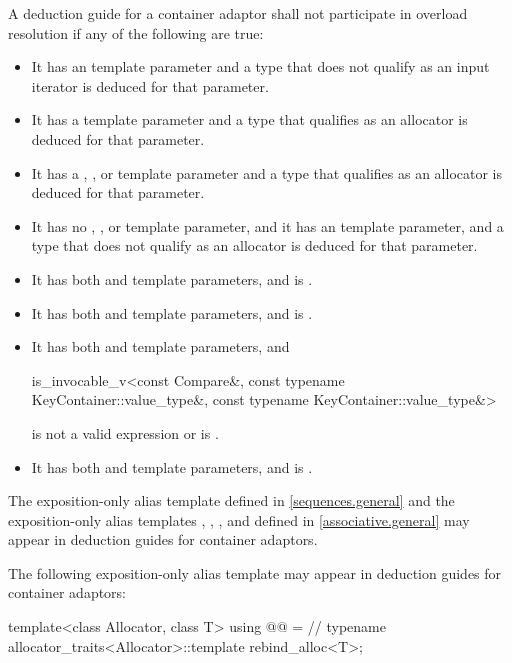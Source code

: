 \pnum
A deduction guide for a container adaptor shall not participate in overload resolution if any of the following are true:
\begin{itemize}
\item It has an  template parameter and a type that does not qualify as an input iterator is deduced for that parameter.
\item It has a  template parameter and a type that qualifies as an allocator is deduced for that parameter.
\item It has a , , or  template parameter and a type that qualifies as an allocator is deduced for that parameter.
\item It has no , , or  template parameter, and it has an  template parameter, and a type that does not qualify as an allocator is deduced for that parameter.
\item It has both  and  template parameters, and  is .
\item It has both  and  template parameters, and
 is .
\item It has both  and  template parameters, and
\begin{codeblock}
is_invocable_v<const Compare&,
              const typename KeyContainer::value_type&,
              const typename KeyContainer::value_type&>
\end{codeblock}
is not a valid expression or is .
\item It has both  and  template parameters, and
 is .
\end{itemize}

\pnum
The exposition-only alias template 
defined in \ref{sequences.general} and
the exposition-only alias templates , ,
, and 
defined in \ref{associative.general}
may appear in deduction guides for container adaptors.

\pnum
The following exposition-only alias template
may appear in deduction guides for container adaptors:
\begin{codeblock}
template<class Allocator, class T>
  using @@ =                      // \expos
    typename allocator_traits<Allocator>::template rebind_alloc<T>;
\end{codeblock}

